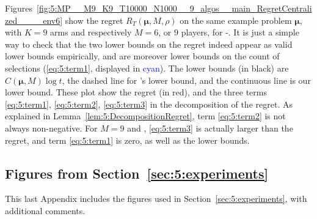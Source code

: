 Figures~\ref{fig:5:MP__M9_K9_T10000_N1000__9_algos__main_RegretCentralized____env6}
show the regret $R_T(\boldsymbol{\mu}, M, \rho)$
on the same example problem $\boldsymbol{\mu}$, with $K = 9$ arms and respectively $M = 6$, or $9$ players, for \Selfish-\klUCB.
%
It is just a simple way to check that the two lower bounds on the regret indeed appear as valid lower bounds empirically,
and are moreover lower bounds on the count of selections (\ref{eq:5:term1}, displayed in \textcolor{blue}{cyan}).
%
The lower bounds (in black) are $C(\boldsymbol{\mu}, M) \log t$, the dashed line
for \citeauthor{Zhao10}'s lower bound, and the continuous line is our lower bound.
%
These plot show the regret (in red),
and the three terms \ref{eq:5:term1}, \ref{eq:5:term2}, \ref{eq:5:term3} in the decomposition of the regret.
As explained in Lemma~\ref{lem:5:DecompositionRegret}, term \ref{eq:5:term2} is not always non-negative.
For $M=9$ and \Selfish, \ref{eq:5:term3} is actually larger than the regret,
and term \ref{eq:5:term1} is zero, as well as the lower bounds.


\subsection{Figures from Section~\ref{sec:5:experiments}}
\label{app:5:plotsFromSec5}

This last Appendix includes the figures used in Section~\ref{sec:5:experiments},
with additional comments.



